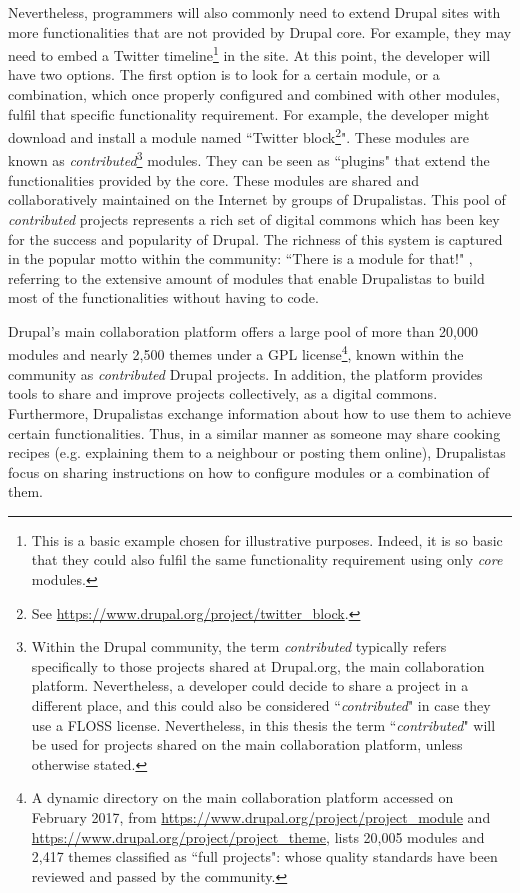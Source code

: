Nevertheless, programmers will also commonly need to extend Drupal sites with more functionalities that are not provided by Drupal core. For example, they may need to embed a Twitter timeline\footnote{This is a basic example chosen for illustrative purposes. Indeed, it is so basic that they could also fulfil the same functionality requirement using only \textit{core} modules.} in the site. At this point, the developer will have two options. The first option is to look for a certain module, or a combination, which once properly configured and combined with other modules, fulfil that specific functionality requirement. For example, the developer might download and install a module named ``Twitter block\footnote{See \url{https://www.drupal.org/project/twitter_block}.}". These modules are known as \textit{contributed}\footnote{Within the Drupal community, the term \textit{contributed} typically refers specifically to those projects shared at Drupal.org, the main collaboration platform. Nevertheless, a developer could decide to share a project in a different place, and this could also be considered ``\textit{contributed}" in case they use a FLOSS license. Nevertheless, in this thesis the term ``\textit{contributed}" will be used for projects shared on the main collaboration platform, unless otherwise stated.} modules. They can be seen as ``plugins" that extend the functionalities provided by the core. These modules are shared and collaboratively maintained on the Internet by groups of Drupalistas. This pool of \textit{contributed} projects represents a rich set of digital commons which has been key for the success and popularity of Drupal. The richness of this system is captured in the popular motto within the community: ``There is a module for that!" \parencite{abbott2016learning}, referring to the extensive amount of modules that enable Drupalistas to build most of the functionalities without having to code.

Drupal's main collaboration platform offers a large pool of more than 20,000 modules and nearly 2,500 themes under a GPL license\footnote{A dynamic directory on the main collaboration platform accessed on  February 2017, from \url{https://www.drupal.org/project/project_module} and \url{https://www.drupal.org/project/project_theme}, lists 20,005 modules and 2,417 themes classified as ``full projects": whose quality standards have been reviewed and passed by the community.}, known within the community as \textit{contributed} Drupal projects. In addition, the platform provides tools to share and improve projects collectively, as a digital commons. Furthermore, Drupalistas exchange information about how to use them to achieve certain functionalities. Thus, in a similar manner as someone may share cooking recipes (e.g. explaining them to a neighbour or posting them online), Drupalistas focus on sharing instructions on how to configure modules or a combination of them.

